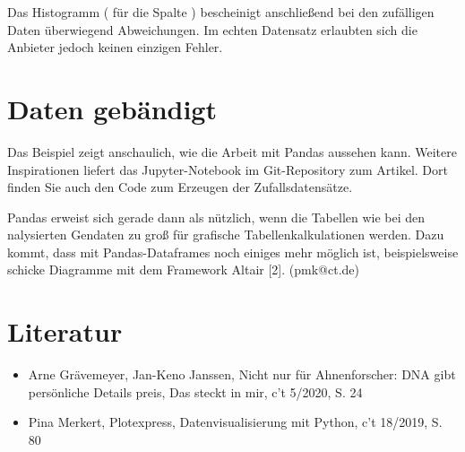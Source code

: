 
\medskip

Das Histogramm ( für die Spalte ) bescheinigt anschließend bei den zufälligen Daten überwiegend Abweichungen. Im echten Datensatz erlaubten sich die Anbieter jedoch keinen einzigen Fehler.
	
\section{Daten gebändigt}

Das Beispiel zeigt anschaulich, wie die Arbeit mit Pandas aussehen kann. Weitere Inspirationen liefert das Jupyter-Notebook im Git-Repository zum Artikel. Dort finden Sie auch den Code zum Erzeugen der Zufallsdatensätze.
	
Pandas erweist sich gerade dann als nützlich, wenn die Tabellen wie bei den nalysierten Gendaten zu groß für grafische Tabellenkalkulationen werden. Dazu kommt, dass mit Pandas-Dataframes noch einiges mehr möglich ist, beispielsweise schicke Diagramme mit dem Framework Altair [2]. (pmk@ct.de)
	
\section{Literatur}

\begin{itemize}
  \item Arne Grävemeyer, Jan-Keno Janssen, Nicht nur für Ahnenforscher: DNA gibt persönliche Details preis, Das steckt in mir, c't 5/2020, S. 24
  \item Pina Merkert, Plotexpress, Datenvisualisierung mit Python, c't 18/2019, S. 80
\end{itemize}	